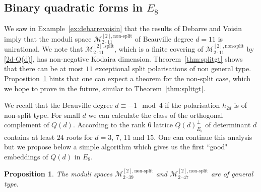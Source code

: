 \documentclass[a4paper,11pt]{article}
\newtheorem{proposition}[lemma]{Proposition}
\newcommand{\cM}{\mathcal M}
\begin{document}
\subsection{Binary quadratic forms in $E_8$}\label{subsect:QE8}

We saw in Example~\ref{ex:debarrevoisin} that the results of
Debarre and Voisin \cite{DV} imply that the moduli space
$\cM^{[2],\text{non-split}}_{2\cdot 11}$ of Beauville degree $d=11$ is
unirational. We note that $\cM^{[2],\text{split}}_{2\cdot 11}$, which
is a finite covering of $\cM^{[2],\text{non-split}}_{2\cdot 11}$ by
\eqref{2d-Q(d)}, has non-negative Kodaira dimension.
Theorem~\ref{thm:splitgt} shows that there can be at most $11$
exceptional split polarisations of non general type.
Proposition~\ref{prop:nonsplitgt} hints that one can expect a theorem
for the non-split case, which we hope to prove in the future, similar
to Theorem~\ref{thm:splitgt}.

We recall that the Beauville degree $d\equiv -1 \mod 4$ if the
polarisation $h_{2d}$ is of non-split type.  For small $d$ we can
calculate the class of the orthogonal complement of $Q(d)$.  According
to \cite[Table $0$]{CS} the rank $6$ lattice $Q(d)^\perp_{E_8}$ of
determinant $d$ contains at least $24$ roots for $d=3$, $7$, $11$ and
$15$.  One can continue this analysis but we propose below a simple
algorithm which gives us the first ``good" embeddings of $Q(d)$ in
$E_8$.

\begin{proposition}\label{prop:nonsplitgt}
The moduli spaces $\cM^{[2],\text{non-split}}_{2\cdot 39}$
and $\cM^{[2],\text{non-split}}_{2\cdot 47}$  are of general type.
\end{proposition}
\end{document}
